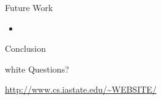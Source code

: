 \begin{frame}{Future Work}
  \begin{itemize}
    \item %
  \end{itemize}
\end{frame}


\begin{frame}{Conclusion}
\end{frame}


\begin{frame}
\begin{beamercolorbox}[center]{white}
  {\Large Questions?}

  \vspace{2em}\hfill

  \url{http://www.cs.iastate.edu/~WEBSITE/}
\end{beamercolorbox}
\end{frame}
